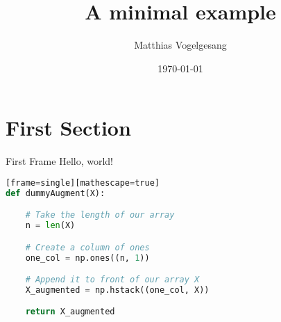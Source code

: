 \documentclass{beamer}
\title{A minimal example}
\date{\today}
\author{Matthias Vogelgesang}
\institute{Centre for Modern Beamer Themes}
\begin{document}
  \maketitle
  \section{First Section}
  \begin{frame}[fragile]{First Frame}
    Hello, world!
    \begin{lstlisting}[language=Python][frame=single][mathescape=true]
def dummyAugment(X):

    # Take the length of our array
    n = len(X)

    # Create a column of ones
    one_col = np.ones((n, 1))

    # Append it to front of our array X
    X_augmented = np.hstack((one_col, X))

    return X_augmented

    \end{lstlisting}
  \end{frame}
\end{document}
